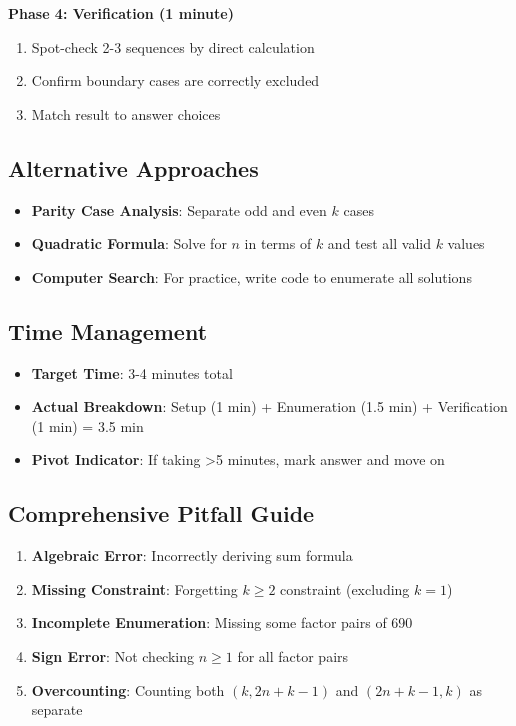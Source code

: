 \documentclass[11pt]{article}
\begin{document}
\begin{roadmapbox}
\textbf{Phase 4: Verification (1 minute)}
\begin{enumerate}
    \item Spot-check 2-3 sequences by direct calculation
    \item Confirm boundary cases are correctly excluded
    \item Match result to answer choices
\end{enumerate}

\subsection*{Alternative Approaches}
\begin{itemize}
    \item \textbf{Parity Case Analysis}: Separate odd and even $k$ cases
    \item \textbf{Quadratic Formula}: Solve for $n$ in terms of $k$ and test all valid $k$ values
    \item \textbf{Computer Search}: For practice, write code to enumerate all solutions
\end{itemize}

\subsection*{Time Management}
\begin{itemize}
    \item \textbf{Target Time}: 3-4 minutes total
    \item \textbf{Actual Breakdown}: Setup (1 min) + Enumeration (1.5 min) + Verification (1 min) = 3.5 min
    \item \textbf{Pivot Indicator}: If taking >5 minutes, mark answer and move on
\end{itemize}

\subsection*{Comprehensive Pitfall Guide}
\begin{enumerate}
    \item \textbf{Algebraic Error}: Incorrectly deriving sum formula
    \item \textbf{Missing Constraint}: Forgetting $k \geq 2$ constraint (excluding $k=1$)
    \item \textbf{Incomplete Enumeration}: Missing some factor pairs of 690
    \item \textbf{Sign Error}: Not checking $n \geq 1$ for all factor pairs
    \item \textbf{Overcounting}: Counting both $(k, 2n+k-1)$ and $(2n+k-1, k)$ as separate
\end{enumerate}
\end{roadmapbox}
\end{document}
